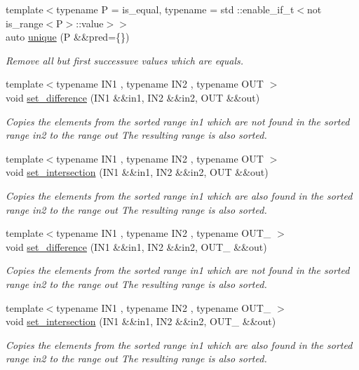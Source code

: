 \begin{DoxyCompactItemize}
{\footnotesize template$<$typename P  = is\+\_\+equal, typename  = std \+::enable\+\_\+if\+\_\+t$<$not is\+\_\+range$<$\+P$>$\+::value$>$$>$ }\\auto \mbox{\hyperlink{namespacerah_aafbbb6f9bd014675985d33d93221acca}{unique}} (P \&\&pred=\{\})
\begin{DoxyCompactList}\small\item\em Remove all but first successuve values which are equals. \end{DoxyCompactList}\item 
{\footnotesize template$<$typename I\+N1 , typename I\+N2 , typename O\+UT $>$ }\\void \mbox{\hyperlink{namespacerah_aca8dbcc943f7c503acea5f58f231a5af}{set\+\_\+difference}} (I\+N1 \&\&in1, I\+N2 \&\&in2, O\+UT \&\&out)
\begin{DoxyCompactList}\small\item\em Copies the elements from the sorted range in1 which are not found in the sorted range in2 to the range out The resulting range is also sorted. \end{DoxyCompactList}\item 
{\footnotesize template$<$typename I\+N1 , typename I\+N2 , typename O\+UT $>$ }\\void \mbox{\hyperlink{namespacerah_a41cb09a0285e2a6814b8aa99f90ba987}{set\+\_\+intersection}} (I\+N1 \&\&in1, I\+N2 \&\&in2, O\+UT \&\&out)
\begin{DoxyCompactList}\small\item\em Copies the elements from the sorted range in1 which are also found in the sorted range in2 to the range out The resulting range is also sorted. \end{DoxyCompactList}\item 
{\footnotesize template$<$typename I\+N1 , typename I\+N2 , typename O\+U\+T\+\_\+ $>$ }\\void \mbox{\hyperlink{namespacerah_a8e9bc244c82d3435e1c8b6bf08696161}{set\+\_\+difference}} (I\+N1 \&\&in1, I\+N2 \&\&in2, O\+U\+T\+\_\+ \&\&out)
\begin{DoxyCompactList}\small\item\em Copies the elements from the sorted range in1 which are not found in the sorted range in2 to the range out The resulting range is also sorted. \end{DoxyCompactList}\item 
{\footnotesize template$<$typename I\+N1 , typename I\+N2 , typename O\+U\+T\+\_\+ $>$ }\\void \mbox{\hyperlink{namespacerah_a8819752794096b634c6153560fc21cc5}{set\+\_\+intersection}} (I\+N1 \&\&in1, I\+N2 \&\&in2, O\+U\+T\+\_\+ \&\&out)
\begin{DoxyCompactList}\small\item\em Copies the elements from the sorted range in1 which are also found in the sorted range in2 to the range out The resulting range is also sorted. \end{DoxyCompactList}\end{DoxyCompactItemize}
